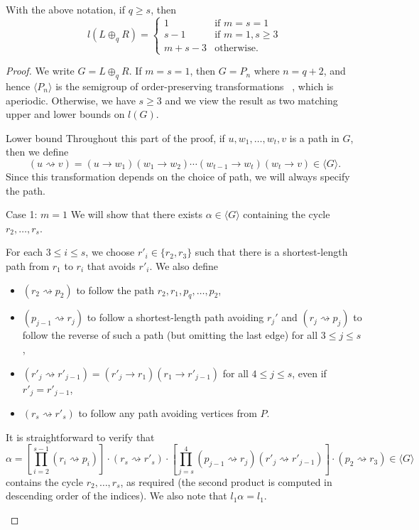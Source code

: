 \documentclass[ALCO,ThmDefs,Unicode,epreuves]{cedram}
\newcommand{\genset}[1]{\langle#1\rangle}
\begin{document}
\begin{proposition} \label{prop:L+R}
 With the above notation, if $q \ge s$, then 
 \[
 l(L \oplus_q R) = \begin{cases}
 1 &\text{if } m = s = 1\\
 s - 1 &\text{if } m = 1, s \ge 3\\
 m + s - 3 & \text{otherwise.}
 \end{cases}
 \]
\end{proposition}
\begin{proof}
 We write $G = L \oplus_q R$. If $m=s=1$, then $G = P_n$ where $n = q+2$, and
 hence $\genset{P_n}$ is the semigroup of order-preserving transformations
~\cite{Aizenshtat1962aa}, which is aperiodic. Otherwise, we have $s \ge 3$ and we view the
 result as two matching upper and lower bounds on $l(G)$.

\begin{enonce*}[remark]{Lower bound} 
 Throughout this part of the proof, if $u, w_1, \ldots, w_t, v$ is a path in
 $G$, then we define \[(u\rightsquigarrow v)=(u\to w_1)(w_1\to
 w_2)\cdots(w_{t-1}\to w_t)(w_t\to v)\in\genset G.\] Since this transformation
 depends on the choice of path, we will always specify the path. 
\end{enonce*} 
 
\begin{enonce*}[remark]{Case 1: ${m = 1}$}
 We will show that there exists $\alpha \in \genset{G}$ containing the cycle
 $r_2, \dots, r_s$. 

 For each $3 \le i \le s$, we choose $r'_i\in \{r_2, r_3\}$ such that there
 is a shortest-length path from $r_1$ to $r_i$ that avoids $r'_i$. We also
 define
 \begin{itemize}
 \item 
 $(r_2 \rightsquigarrow p_2)$ to follow 
 the path $r_2, r_1, p_q, \ldots, p_2$,

 \item 
 $(p_{j - 1} \rightsquigarrow r_j)$ to follow a shortest-length path
 avoiding $r_j'$ and $(r_j\rightsquigarrow p_j)$ to follow the reverse of
 such a path (but omitting the last edge) for all $3 \leq j \leq s$,

 \item
 $(r'_j \rightsquigarrow r'_{j - 1}) = (r'_j \to r_1) (r_1 \to r'_{j -
 1})$ for all $4 \leq j \leq s$, even if $r'_j=r'_{j-1}$,

 \item
 $(r_s \rightsquigarrow r'_s)$ to follow any path avoiding vertices from
 $P$.
 \end{itemize}
 It is straightforward to verify that 
 \[
 \alpha = \left[
 \prod_{i = 2}^{s - 1} 
 (r_i \rightsquigarrow p_i)
 \right]
 \cdot 
 (r_s \rightsquigarrow r'_s) 
 \cdot 
 \left[
 \prod_{j = s} ^ {4} 
 (p_{j-1} \rightsquigarrow r_j)
 (r'_j \rightsquigarrow r'_{j-1}) 
 \right] 
 \cdot 
 (p_2 \rightsquigarrow r_3) \in\genset{G}
 \]
 contains the cycle $r_2, \dots, r_s$, as required (the second
 product is computed in descending order of the indices). We also note that
 $l_1\alpha=l_1$.
\end{enonce*}


\end{proof}
\end{document}
